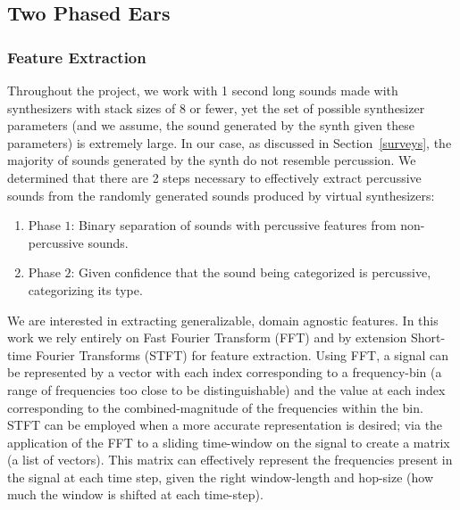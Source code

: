 \documentclass[\main/thesis.tex]{subfiles}
\begin{document}
\subsection{Two Phased Ears}
\label{sec:ear}
\subsubsection{Feature Extraction}
Throughout the project, we work with 1 second long sounds made with synthesizers with stack sizes of 8 or fewer, yet the set of possible synthesizer parameters (and we assume, the sound generated by the synth given these parameters) is extremely large. In our case, as discussed in Section~\ref{surveys}, the majority of sounds generated by the synth do not resemble percussion.  We determined that there are 2 steps necessary to effectively extract percussive sounds
from the randomly generated sounds produced by virtual synthesizers: 
\begin{enumerate}
   \item  Phase $1$: Binary separation of sounds with percussive features from non-percussive sounds.
   \item Phase $2$: Given confidence that the sound being categorized is percussive, categorizing its type.
\end{enumerate}
We are interested in extracting generalizable, domain agnostic features. In this work we rely entirely on Fast Fourier Transform (FFT) and by extension Short-time Fourier Transforms (STFT) for feature extraction. Using FFT, a signal can be represented by a vector with each index corresponding to a frequency-bin (a range of frequencies too close to be distinguishable) and the value at each index corresponding to the combined-magnitude of the frequencies within the bin. STFT can be employed when a more accurate representation is desired; via the application of the FFT to a sliding time-window on the signal to create a matrix (a list of vectors). This matrix can effectively represent the frequencies present in the signal at each time step, given the right window-length and hop-size (how much the window is shifted at each time-step).
\end{document}
